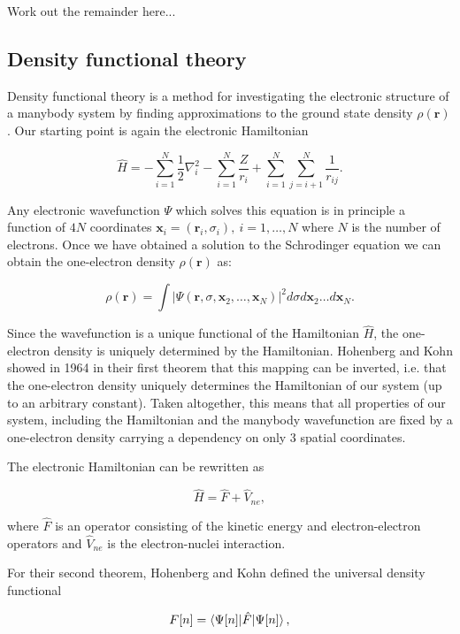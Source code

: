 Work out the remainder here...

\subsection{Density functional theory}
Density functional theory is a method for
investigating the electronic structure of a manybody system
by finding approximations to the ground state
density $\rho(\bm{r})$. Our starting point
is again the electronic Hamiltonian

\begin{equation}
    \hat{H} = -\sum_{i=1}^N \frac{1}{2} \nabla_i^2
    - \sum_{i=1}^N \frac{Z}{r_{i}} + \sum_{i=1}^N \sum_{j=i+1}^N
    \frac{1}{r_{ij}} .
\end{equation}

Any electronic wavefunction $\Psi$ which solves this equation
is in principle a function of $4N$ coordinates $\bm{x}_i = (\bm{r}_i, \sigma_i)
, \ i=1,\dots,N$
where $N$ is the number of electrons.
Once we have obtained a solution to the Schrodinger equation
we can obtain the one-electron density $\rho(\bm{r})$ as:

\begin{equation}
    \rho(\bm{r}) = \int \left| \Psi(\bm{r}, \sigma, \bm{x}_2,\dots,\bm{x}_N)
    \right|^2 d\sigma d\bm{x}_2 \dots d\bm{x}_N .
\end{equation}

Since the wavefunction is a unique functional of the Hamiltonian
$\hat{H}$, the one-electron density is uniquely determined
by the Hamiltonian. Hohenberg and Kohn showed in 1964 in their
first theorem that this mapping
can be inverted, i.e. that the one-electron density uniquely
determines the Hamiltonian of our system (up to an arbitrary constant).
Taken altogether, this means that all properties of our system, including
the Hamiltonian and the manybody wavefunction are fixed
by a one-electron density carrying a dependency on only 3 spatial coordinates.
\par
The electronic Hamiltonian can be rewritten as

$$ \hat{H} = \hat{F} + \hat{V}_{ne} , $$

where $\hat{F}$ is an operator consisting of the kinetic energy
and electron-electron operators and $\hat{V}_{ne}$
is the electron-nuclei interaction.
\par
For their second theorem, Hohenberg and Kohn defined
the universal density functional

$$ F[n] = \braket{\Psi[n] | \hat{F} | \Psi[n]} , $$

